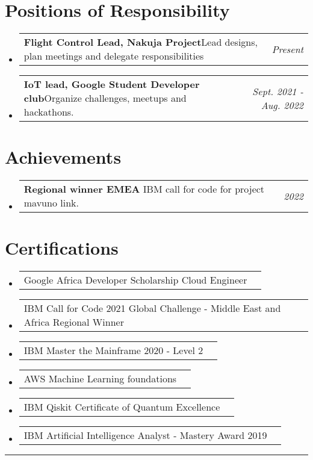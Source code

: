 \documentclass[a4paper,11pt]{article}
\makeatletter
\newcommand{\resumePOR}[3]{
\vspace{0.5mm}\item
    \begin{tabular*}{0.97\textwidth}[t]{l@{\extracolsep{\fill}}r}
        \textbf{#1}\hspace{0.3mm}#2 & \textit{\small{#3}} 
    \end{tabular*}
    \vspace{-2mm}
}
\newcommand{\resumeSubHeadingListStart}{\begin{itemize}[leftmargin=*,labelsep=0mm]}
\newcommand{\resumeSubHeadingListEnd}{\end{itemize}\vspace{2mm}}
\makeatother
\begin{document}
\section{Positions of Responsibility}
\vspace{-0.4mm}
\resumeSubHeadingListStart
\resumePOR{Flight Control Lead, Nakuja Project} %
    {Lead designs, plan meetings and delegate responsibilities} %
    {Present} %
\resumePOR{IoT lead, Google Student Developer club} %
    {Organize challenges, meetups and hackathons. } %
    {Sept. 2021 - Aug. 2022} %
\resumeSubHeadingListEnd
\vspace{-4mm}


\section{Achievements}
\vspace{-0.4mm}
\resumeSubHeadingListStart
\resumePOR{Regional winner EMEA } %
    {IBM call for code for project mavuno link. } %
    {2022} %
    
\resumeSubHeadingListEnd
\vspace{-4mm}

\section{Certifications}
\vspace{-0.2mm}
\resumeSubHeadingListStart
\resumePOR{}{
Google Africa Developer Scholarship Cloud Engineer
}{}

\resumePOR{}{
IBM Call for Code 2021 Global Challenge - Middle East and Africa Regional Winner 
}{}

\resumePOR{}{
IBM Master the Mainframe 2020 - Level 2
}{}
\resumePOR{}{
AWS Machine Learning foundations
}{}
\resumePOR{}{
IBM Qiskit Certificate of Quantum Excellence
}{}
\resumePOR{}{
IBM Artificial Intelligence Analyst - Mastery Award 2019
}{}
\resumeSubHeadingListEnd



\hspace*{-5mm}\rule{1.035\textwidth}{0.1mm}

\end{document}
